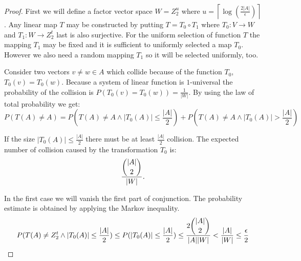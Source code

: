 \begin{proof}
First we will define a factor vector space $W = Z_2^u$ where $u = \left\lceil \log (\frac{2|A|}{\epsilon}) \right\rceil$. Any linear map $T$ may be constructed by putting $T = T_0 \circ T_1$ where $T_0: V \rightarrow W$ and $T_1: W \rightarrow Z_2^t$ last is also surjective. For the uniform selection of function $T$ the mapping $T_1$ may be fixed and it is sufficient to uniformly selected a map $T_0$. However we also need a random mapping $T_1$ so it will be selected uniformly, too.

Consider two vectors $v \neq w \in A$ which collide because of the function $T_0$, $T_0(v) = T_0(w)$. Because a system of linear function is $1$-universal the probability of the collision is $P(T_0(v) = T_0(w)) = \frac{1}{|W|}$. By using the law of total probability we get:
\begin{displaymath}
P(T(A) \neq A) = P(T(A) \neq A \wedge |T_0(A)| \leq \frac{|A|}{2}) + P(T(A) \neq A \wedge |T_0(A)| > \frac{|A|}{2})
\end{displaymath}

If the size $|T_0(A)| \leq \frac{|A|}{2}$ there must be at least $\frac{|A|}{2}$ collision. The expected number of collision caused by the transformation $T_0$ is:
\begin{displaymath}
\frac{\dbinom{|A|}{2}}{|W|}\textit{.}
\end{displaymath}

In the first case we will vanish the first part of conjunction. The probability estimate is obtained by applying the Markov inequality.
\begin{displaymath}
P(T(A) \neq Z_2^t \wedge |T_0(A)| \leq \frac{|A|}{2}) \leq P(|T_0(A)| \leq \frac{|A|}{2}) \leq \frac{2 \dbinom{|A|}{2}}{|A||W|} < \frac{|A|}{|W|} \leq \frac{\epsilon}{2}
\end{displaymath}


\end{proof}
